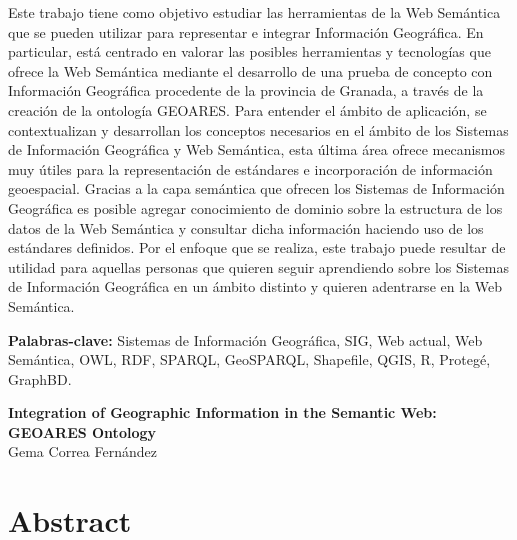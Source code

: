Este trabajo tiene como objetivo estudiar las herramientas de la Web Semántica que se pueden utilizar para representar e integrar Información Geográfica. En particular, está centrado en valorar las posibles herramientas y tecnologías que ofrece la Web Semántica mediante el desarrollo de una prueba de concepto con Información Geográfica procedente de la provincia de Granada, a través de la creación de la ontología GEOARES. Para entender el ámbito de aplicación, se contextualizan y desarrollan los conceptos necesarios en el ámbito de los Sistemas de Información Geográfica y Web Semántica, esta última área ofrece mecanismos muy útiles para la representación de estándares e incorporación de información geoespacial. Gracias a la capa semántica que ofrecen los Sistemas de Información Geográfica es posible agregar conocimiento de dominio sobre la estructura de los datos de la Web Semántica y consultar dicha información haciendo uso de los estándares definidos. Por el enfoque que se realiza, este trabajo puede resultar de utilidad para aquellas personas que quieren seguir aprendiendo sobre los Sistemas de Información Geográfica en un ámbito distinto y quieren adentrarse en la Web Semántica.



\vspace{0.25in}

{\bf Palabras-clave:} Sistemas de Información Geográfica, SIG, Web actual, Web Semántica, OWL, RDF, SPARQL, GeoSPARQL, Shapefile, QGIS, R,  Protegé, GraphBD.

\cleardoublepage


\thispagestyle{empty}


\begin{center} 
	\large{\textbf{Integration of Geographic Information in the Semantic Web:\\ GEOARES Ontology}}\\
	\vspace{0.25in}
	Gema Correa Fernández
\end{center}

\section*{Abstract} 


